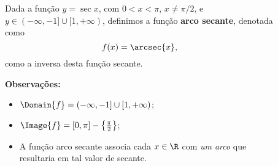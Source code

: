 \begin{frame}
  \begin{columns}[onlytextwidth]
    \begin{column}{0.49\textwidth}\vspace{-0.5cm}
      \begin{definition}
        Dada a função $y=\sec{x}$, com $0 < x < \pi$, $x\not=\pi/2$, e $y\in(-\infty,-1]\cup[1,+\infty)$, definimos a função \textbf{arco secante}, denotada como
        \begin{equation*}
          f(x) = \arcsec{x},
        \end{equation*}
        como a inversa desta função secante.
      \end{definition}
      \begin{highlight}
        \textbf{Observações:}
        \vspace{-0.05cm}
        \begin{itemize}
          \item $\Domain{f} = (-\infty,-1]\cup[1,+\infty)$;
          \item $\Image{f} = [0,\pi]-\left\{\frac{\pi}{2}\right\}$;
          \item A função arco secante associa cada $x\in\R$ com \emph{um arco} que resultaria em tal valor de secante.
        \end{itemize}
      \end{highlight}
    \end{column}
    \begin{column}{0.49\textwidth}\vspace*{-0.5cm}
      \begin{figure}
      \end{figure}
    \end{column}
  \end{columns}
\end{frame}
